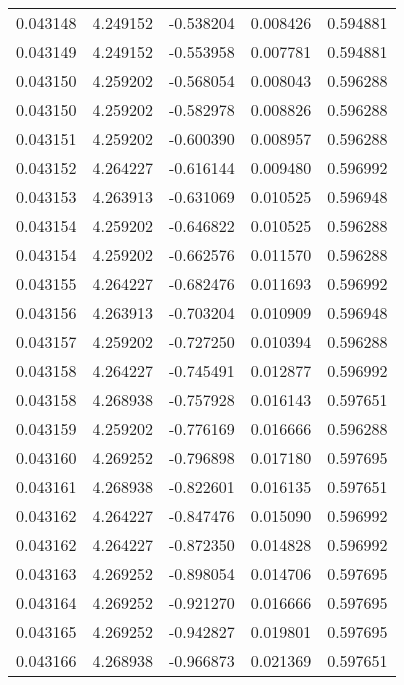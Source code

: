 \begin{tabular}{lrrrr}
0.043148    &  4.249152 & -0.538204 &  0.008426 &             0.594881 \\
0.043149    &  4.249152 & -0.553958 &  0.007781 &             0.594881 \\
0.043150    &  4.259202 & -0.568054 &  0.008043 &             0.596288 \\
0.043150    &  4.259202 & -0.582978 &  0.008826 &             0.596288 \\
0.043151    &  4.259202 & -0.600390 &  0.008957 &             0.596288 \\
0.043152    &  4.264227 & -0.616144 &  0.009480 &             0.596992 \\
0.043153    &  4.263913 & -0.631069 &  0.010525 &             0.596948 \\
0.043154    &  4.259202 & -0.646822 &  0.010525 &             0.596288 \\
0.043154    &  4.259202 & -0.662576 &  0.011570 &             0.596288 \\
0.043155    &  4.264227 & -0.682476 &  0.011693 &             0.596992 \\
0.043156    &  4.263913 & -0.703204 &  0.010909 &             0.596948 \\
0.043157    &  4.259202 & -0.727250 &  0.010394 &             0.596288 \\
0.043158    &  4.264227 & -0.745491 &  0.012877 &             0.596992 \\
0.043158    &  4.268938 & -0.757928 &  0.016143 &             0.597651 \\
0.043159    &  4.259202 & -0.776169 &  0.016666 &             0.596288 \\
0.043160    &  4.269252 & -0.796898 &  0.017180 &             0.597695 \\
0.043161    &  4.268938 & -0.822601 &  0.016135 &             0.597651 \\
0.043162    &  4.264227 & -0.847476 &  0.015090 &             0.596992 \\
0.043162    &  4.264227 & -0.872350 &  0.014828 &             0.596992 \\
0.043163    &  4.269252 & -0.898054 &  0.014706 &             0.597695 \\
0.043164    &  4.269252 & -0.921270 &  0.016666 &             0.597695 \\
0.043165    &  4.269252 & -0.942827 &  0.019801 &             0.597695 \\
0.043166    &  4.268938 & -0.966873 &  0.021369 &             0.597651 \\

\end{tabular}
